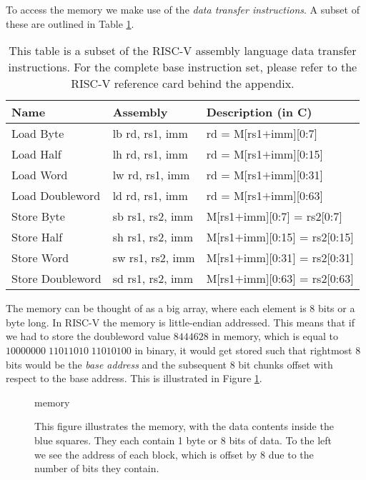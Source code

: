     To access the memory we make use of the \textit{data transfer instructions}. A subset of these are outlined in Table \ref{table:RISCVDataTranferInstructions}.
    
    \begin{table}[h!]
        \centering
        \begin{tabular}{|l|l|l|}
            \hline
            Name             & Assembly         & Description (in C)             \\ \hline
            Load Byte        & lb rd, rs1, imm  & rd = M[rs1$+$imm][0:7]         \\
            Load Half        & lh rd, rs1, imm  & rd = M[rs1$+$imm][0:15]        \\
            Load Word        & lw rd, rs1, imm  & rd = M[rs1$+$imm][0:31]        \\
            Load Doubleword  & ld rd, rs1, imm  & rd = M[rs1$+$imm][0:63]        \\ \hline
            Store Byte       & sb rs1, rs2, imm & M[rs1$+$imm][0:7] = rs2[0:7]   \\
            Store Half       & sh rs1, rs2, imm & M[rs1$+$imm][0:15] = rs2[0:15] \\
            Store Word       & sw rs1, rs2, imm & M[rs1$+$imm][0:31] = rs2[0:31] \\
            Store Doubleword & sd rs1, rs2, imm & M[rs1$+$imm][0:63] = rs2[0:63] \\ \hline
        \end{tabular}
        \caption{This table is a subset of the RISC-V assembly language data transfer instructions. For the complete base instruction set, please refer to the RISC-V reference card behind the appendix.}
        \label{table:RISCVDataTranferInstructions}
    \end{table}

    The memory can be thought of as a big array, where each element is 8 bits or a byte long. In RISC-V the memory is little-endian addressed. This means that if we had to store the doubleword value $8444628$ in memory, which is equal to $10000000 \; 11011010 \; 11010100$ in binary, it would get stored such that rightmost 8 bits would be the \textit{base address} and the subsequent 8 bit chunks offset with respect to the base address. This is illustrated in Figure \ref{fig:memory}.
    
    \begin{figure}[h!]
        \centering
        {memory}
        \caption{This figure illustrates the memory, with the data contents inside the blue squares. They each contain 1 byte or 8 bits of data. To the left we see the address of each block, which is offset by 8 due to the number of bits they contain.}
        \label{fig:memory}
    \end{figure}

